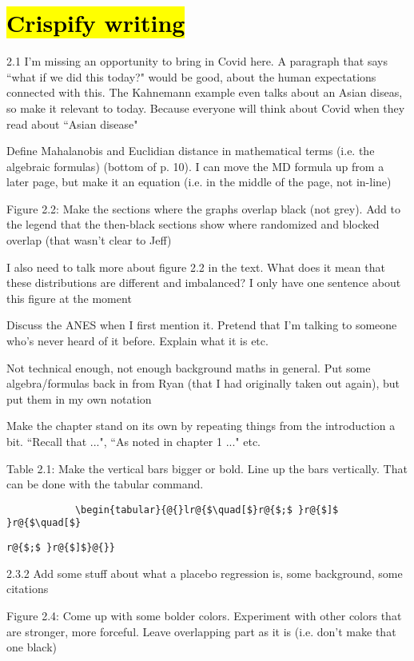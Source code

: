 \documentclass[12pt]{article}
\begin{document}
\section*{\hl{Crispify writing}}
	\begin{coi}
		\item 2.1 I'm missing an opportunity to bring in Covid here. A paragraph that says ``what if we did this today?" would be good, about the human expectations connected with this. The Kahnemann example even talks about an Asian diseas, so make it relevant to today. Because everyone will think about Covid when they read about ``Asian disease"
		\item Define Mahalanobis and Euclidian distance in mathematical terms (i.e. the algebraic formulas) (bottom of p. 10). I can move the MD formula up from a later page, but make it an equation (i.e. in the middle of the page, not in-line)
		\item Figure 2.2: Make the sections where the graphs overlap black (not grey). Add to the legend that the then-black sections show where randomized and blocked overlap (that wasn't clear to Jeff)
		\item I also need to talk more about figure 2.2 in the text. What does it mean that these distributions are different and imbalanced? I only have one sentence about this figure at the moment
		\item Discuss the ANES when I first mention it. Pretend that I'm talking to someone who's never heard of it before. Explain what it is etc.
		\item Not technical enough, not enough background maths in general. Put some algebra/formulas back in from Ryan (that I had originally taken out again), but put them in my own notation
		\item Make the chapter stand on its own by repeating things from the introduction a bit. ``Recall that ...", ``As noted in chapter 1 ..." etc. 
		\item Table 2.1: Make the vertical bars bigger or bold. Line up the bars vertically. That can be done with the {tabular} command. \begin{verbatim}
			\begin{tabular}{@{}lr@{$\quad[$}r@{$;$ }r@{$]$ }r@{$\quad[$}\end{verbatim}
			\begin{verbatim}r@{$;$ }r@{$]$}@{}}\end{verbatim}
 		\item 2.3.2 Add some stuff about what a placebo regression is, some background, some citations
 		\item Figure 2.4: Come up with some bolder colors. Experiment with other colors that are stronger, more forceful. Leave overlapping part as it is (i.e. don't make that one black)
	\end{coi}
\end{document}
